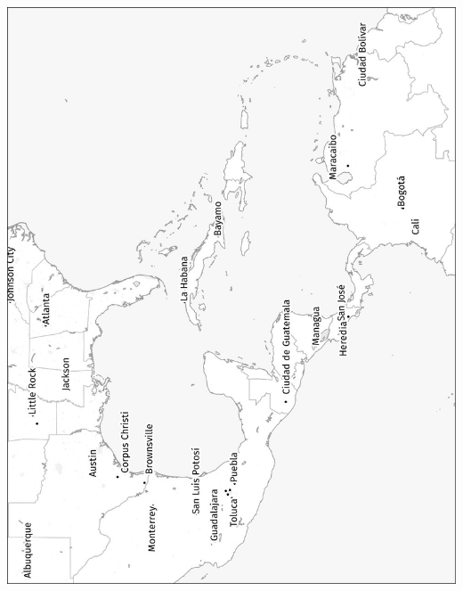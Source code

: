 \begin{minipage}{\textwidth} \includegraphics[width=\textwidth]{maps/Ameriko-centra.jpg} \end{minipage}
